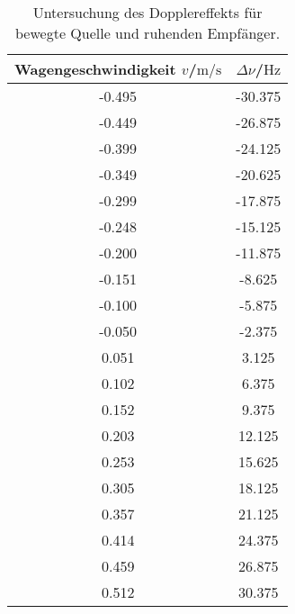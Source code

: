 \begin{table}
	\centering
	\caption{Untersuchung des Dopplereffekts für bewegte Quelle und ruhenden Empfänger.}
	\label{tab:direkt}
	\begin{tabular}{cc}
		\toprule
		Wagengeschwindigkeit $v$/$\si{\meter\per\second}$ & $\Delta \nu$/$\si{\Hz}$ \\
		\midrule
		-0.495                                            & -30.375                 \\
		-0.449                                            & -26.875                 \\
		-0.399                                            & -24.125                 \\
		-0.349                                            & -20.625                 \\
		-0.299                                            & -17.875                 \\
		-0.248                                            & -15.125                 \\
		-0.200                                            & -11.875                 \\
		-0.151                                            & -8.625                  \\
		-0.100                                            & -5.875                  \\
		-0.050                                            & -2.375                  \\
		0.051                                             & 3.125                   \\
		0.102                                             & 6.375                   \\
		0.152                                             & 9.375                   \\
		0.203                                             & 12.125                  \\
		0.253                                             & 15.625                  \\
		0.305                                             & 18.125                  \\
		0.357                                             & 21.125                  \\
		0.414                                             & 24.375                  \\
		0.459                                             & 26.875                  \\
		0.512                                             & 30.375                  \\
		\bottomrule
	\end{tabular}
\end{table}
